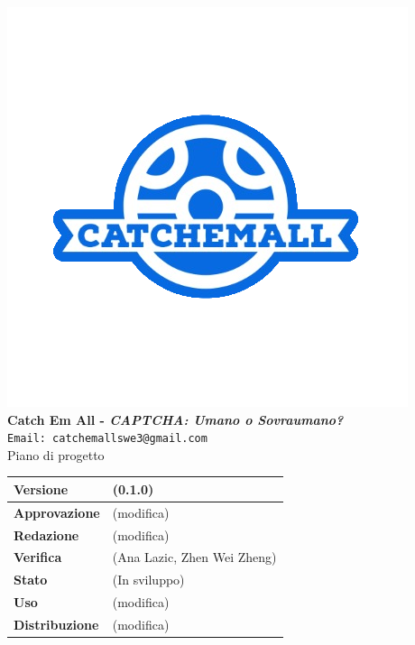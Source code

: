\begin{titlepage}
\begin{center}
	\includegraphics[scale = 1.5]{img/logo.png}\\
	\bigskip
	\large \textbf{Catch Em All - \textit{CAPTCHA: Umano o Sovraumano?}}\\
	\texttt{Email: catchemallswe3@gmail.com}\\
	\vfill
	{\fontsize{1.5cm}{0}\selectfont Piano di progetto}\\
	\vfill
		\centering
		\setlength\extrarowheight{4pt}
		\begin{tabular}{| m{4.5cm} | m{4.5cm} |}
			\hline
			\textbf{Versione} & (0.1.0)\\
			\hline
			\textbf{Approvazione} & (modifica)\\
			\hline
			\textbf{Redazione} & (modifica)\\
			\hline
			\textbf{Verifica} & (Ana Lazic, Zhen Wei Zheng)\\
			\hline
			\textbf{Stato} & (In sviluppo)\\
			\hline
			\textbf{Uso} & (modifica)\\
			\hline
			\textbf{Distribuzione} & (modifica)\\
			\hline
		\end{tabular}\\
\end{center}
\end{titlepage}

